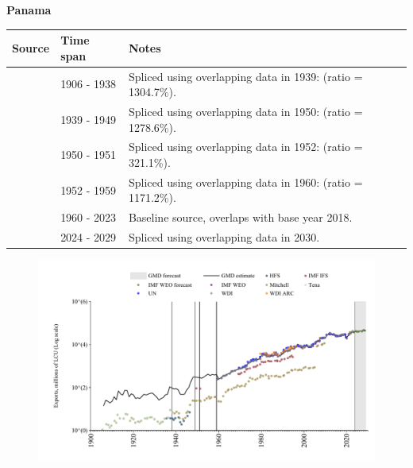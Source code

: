 \documentclass[12pt,a4paper,landscape]{article}
\begin{document}
\begin{adjustbox}{max totalsize={\paperwidth}{\paperheight},center}
\begin{minipage}[t][\textheight][t]{\textwidth}
\vspace*{0.5cm}
{}
\begin{center}
{\Large\bfseries Panama}
\end{center}
\vspace{0.5cm}
\begin{table}[H]
\centering
\small
\begin{tabular}{|l|l|l|}
\hline
\textbf{Source} & \textbf{Time span} & \textbf{Notes} \\
\hline
\rowcolor{white}\cite{Tena}& 1906 - 1938 &Spliced using overlapping data in 1939: (ratio = 1304.7\%).\\
\rowcolor{lightgray}\cite{Mitchell}& 1939 - 1949 &Spliced using overlapping data in 1950: (ratio = 1278.6\%).\\
\rowcolor{white}\cite{IMF_IFS}& 1950 - 1951 &Spliced using overlapping data in 1952: (ratio = 321.1\%).\\
\rowcolor{lightgray}\cite{Mitchell}& 1952 - 1959 &Spliced using overlapping data in 1960: (ratio = 1171.2\%).\\
\rowcolor{white}\cite{WDI}& 1960 - 2023 &Baseline source, overlaps with base year 2018.\\
\rowcolor{lightgray}\cite{IMF_WEO_forecast}& 2024 - 2029 &Spliced using overlapping data in 2030.\\
\hline
\end{tabular}
\end{table}
\begin{figure}[H]
\centering
\includegraphics[width=\textwidth,height=0.6\textheight,keepaspectratio]{graphs/PAN_exports.pdf}
\end{figure}
\end{minipage}
\end{adjustbox}
\end{document}
